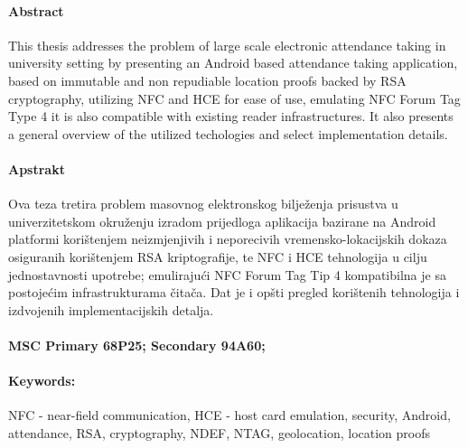 \afterpage{\blankpage}
\paragraph*{Abstract}
This thesis addresses the problem of large scale electronic attendance taking in university setting by presenting an Android based attendance taking application, based on immutable and non repudiable location proofs backed by RSA cryptography, utilizing NFC and HCE for ease of use, emulating NFC Forum Tag Type 4 it is also compatible with existing reader infrastructures. It also presents a general overview of the utilized techologies and select implementation details.

\paragraph*{Apstrakt}
Ova teza tretira problem masovnog elektronskog bilježenja prisustva u univerzitetskom okruženju izradom prijedloga aplikacija bazirane na Android platformi korištenjem neizmjenjivih i neporecivih vremensko-lokacijskih dokaza osiguranih korištenjem RSA kriptografije, te NFC i HCE tehnologija u cilju jednostavnosti upotrebe; emulirajući NFC Forum Tag Tip 4 kompatibilna je sa postojećim infrastrukturama čitača. Dat je i opšti pregled korištenih tehnologija i izdvojenih implementacijskih detalja.

\paragraph*{MSC Primary 68P25; Secondary 94A60;}
\paragraph*{Keywords:} NFC - near-field communication, HCE - host card emulation, security, Android, attendance, RSA, cryptography, NDEF, NTAG, geolocation, location proofs